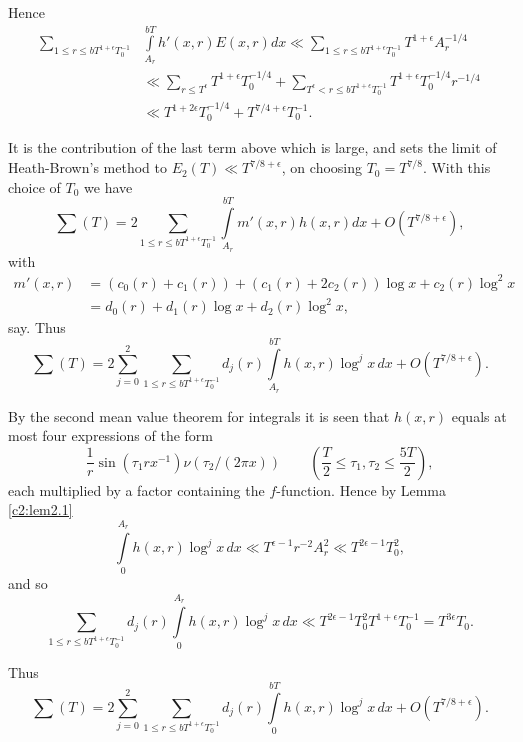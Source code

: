 Hence
\begin{align*}
  \sum_{1 \leq r \leq bT^{1+ \epsilon}T_0^{-1}} &\int\limits_{A_r}^{bT}
  h' (x, r) E (x, r)dx \ll \sum_{1 \leq r \leq bT^{1+ \epsilon}
    T_0^{-1}} T^{1+ \epsilon}A_r^{-1/4}\\
  & \ll \sum_{r \leq T^\epsilon} T^{1+ \epsilon}T_0^{-1/4} +
  \sum_{T^\epsilon < r \leq bT ^{1+\epsilon}T_0^{-1}} T^{1+ \epsilon}
  T_0^{-1/4}r^{-1/4}\\
  & \ll T^{1+2 \epsilon}T_0^{- 1/4} + T^{7/4+\epsilon}T_0^{-1}.
\end{align*}

It is the contribution of the last term above which is large, and sets
the limit of Heath-Brown's method to $E_2(T) \ll T^{7/8+\epsilon}$, on
choosing $T_0 = T^{7/8}$. With this choice of $T_0$ we have
$$ 
\sum(T) = 2 \sum_{1 \leq r \leq b T^{1+ \epsilon}T_0^{-1}}
\int\limits_{A_r}^{bT} m' (x, r) h (x, r) dx + O \left(T^{7/8+\epsilon}\right), 
$$
with\pageoriginale
\begin{align*}
  m' (x, r) & = \left(c_0 (r) + c_1 (r)\right) + \left(c_1(r) + 2 c_2
  (r)\right) \log x + c_2 (r) \log^2 x\\[5pt]
  & = d_0 (r) + d_1 (r) \log x + d_2 (r) \log^2 x,
\end{align*}
say. Thus 
$$
\sum (T) = 2 \sum^2_{j=0} \sum_{1 \leq r \leq bT^{1+ \epsilon}
  T_0^{-1}} d_j (r) \int\limits_{A_r}^{bT} h (x, r) \log^j x \, dx +
O\left(T^{7/8+\epsilon}\right).  
$$

By the second mean value theorem for integrals it is seen that $h(x,
r)$ equals at most four expressions of the form
$$ 
\frac{1}{r} \sin (\tau_1 rx^{-1}) \nu (\tau_2/(2\pi x)) \qquad
\left(\frac{T}{2} \leq \tau_1, \tau_2 \leq \frac{5T}{2} \right),
$$
each multiplied by a factor containing the $f$-function. Hence by
Lemma \ref{c2:lem2.1} 
$$
\int\limits_0^{A_r} h (x, r) \log^j x \, dx \ll T^{\epsilon
  -1}r^{-2}A_r^2 \ll T^{2\epsilon-1} T^2_0,
$$
and so 
$$
\sum_{1 \leq r \leq bT^{1+ \epsilon}T^{-1}_0} d_j (r)
\int\limits_0^{A_r} h(x, r) \log^j x\, dx \ll T^{2\epsilon -1} T^2_0
T^{1+ \epsilon} T_0^{-1} = T^{3 \epsilon}T_0.
$$

Thus 
$$
\sum(T) =2 \sum_{j=0}^2 \sum_{1 \leq r \leq bT^{1+ \epsilon} T_0^{-1}}
d_j(r) \int\limits_0^{bT} h(x, r) \log^j x\, dx + O(T^{7/8+\epsilon}).
$$

